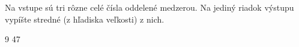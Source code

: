 




Na vstupe sú tri rôzne celé čísla oddelené medzerou. Na jediný riadok výstupu vypíšte stredné (z
hľadiska veľkosti) z nich.

 9 47
\koniec


